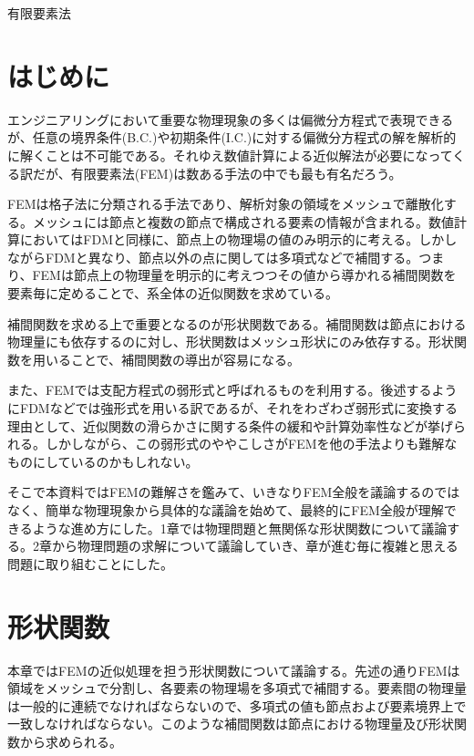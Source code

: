 \documentclass[dvipdfmx, 9pt, a4paper]{jsarticle}
\numberwithin{equation}{section}
\begin{document}
\begin{center}
{\fontsize{18pt}{1pt}\selectfont 有限要素法}\\
\end{center}
\section*{はじめに}
エンジニアリングにおいて重要な物理現象の多くは偏微分方程式で表現できるが、任意の境界条件(B.C.)や初期条件(I.C.)に対する偏微分方程式の解を解析的に解くことは不可能である。それゆえ数値計算による近似解法が必要になってくる訳だが、有限要素法(FEM)は数ある手法の中でも最も有名だろう。\par
FEMは格子法に分類される手法であり、解析対象の領域をメッシュで離散化する。メッシュには節点と複数の節点で構成される要素の情報が含まれる。数値計算においてはFDMと同様に、節点上の物理場の値のみ明示的に考える。しかしながらFDMと異なり、節点以外の点に関しては多項式などで補間する。つまり、FEMは節点上の物理量を明示的に考えつつその値から導かれる補間関数を要素毎に定めることで、系全体の近似関数を求めている。\par
補間関数を求める上で重要となるのが形状関数である。補間関数は節点における物理量にも依存するのに対し、形状関数はメッシュ形状にのみ依存する。形状関数を用いることで、補間関数の導出が容易になる。\par
また、FEMでは支配方程式の弱形式と呼ばれるものを利用する。後述するようにFDMなどでは強形式を用いる訳であるが、それをわざわざ弱形式に変換する理由として、近似関数の滑らかさに関する条件の緩和や計算効率性などが挙げられる。しかしながら、この弱形式のややこしさがFEMを他の手法よりも難解なものにしているのかもしれない。\par
そこで本資料ではFEMの難解さを鑑みて、いきなりFEM全般を議論するのではなく、簡単な物理現象から具体的な議論を始めて、最終的にFEM全般が理解できるような進め方にした。1章では物理問題と無関係な形状関数について議論する。2章から物理問題の求解について議論していき、章が進む毎に複雑と思える問題に取り組むことにした。

\section{形状関数}
本章ではFEMの近似処理を担う形状関数について議論する。先述の通りFEMは領域をメッシュで分割し、各要素の物理場を多項式で補間する。要素間の物理量は一般的に連続でなければならないので、多項式の値も節点および要素境界上で一致しなければならない。このような補間関数は節点における物理量及び形状関数から求められる。
\end{document}
